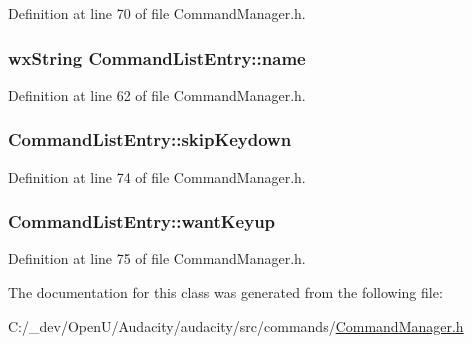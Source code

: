 Definition at line 70 of file Command\+Manager.\+h.

\subsubsection[{\texorpdfstring{name}{name}}]{\setlength{\rightskip}{0pt plus 5cm}wx\+String Command\+List\+Entry\+::name}\hypertarget{struct_command_list_entry_a306005d69b642db6dd086b67ffa7b36a}{}\label{struct_command_list_entry_a306005d69b642db6dd086b67ffa7b36a}


Definition at line 62 of file Command\+Manager.\+h.

\subsubsection[{\texorpdfstring{skip\+Keydown}{skipKeydown}}]{ Command\+List\+Entry\+::skip\+Keydown}\hypertarget{struct_command_list_entry_ad033eb5adff81d38dbcfff33003ffda9}{}\label{struct_command_list_entry_ad033eb5adff81d38dbcfff33003ffda9}


Definition at line 74 of file Command\+Manager.\+h.

\subsubsection[{\texorpdfstring{want\+Keyup}{wantKeyup}}]{ Command\+List\+Entry\+::want\+Keyup}\hypertarget{struct_command_list_entry_a730ea593b6ad7f54424ab681ba3c87c1}{}\label{struct_command_list_entry_a730ea593b6ad7f54424ab681ba3c87c1}


Definition at line 75 of file Command\+Manager.\+h.



The documentation for this class was generated from the following file\+:\begin{DoxyCompactItemize}
\item 
C\+:/\+\_\+dev/\+Open\+U/\+Audacity/audacity/src/commands/\hyperlink{_command_manager_8h}{Command\+Manager.\+h}\end{DoxyCompactItemize}
